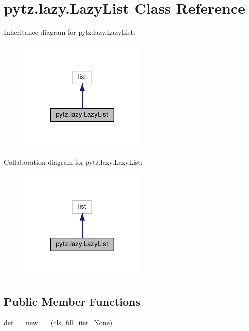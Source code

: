 \hypertarget{classpytz_1_1lazy_1_1LazyList}{}\section{pytz.\+lazy.\+Lazy\+List Class Reference}
\label{classpytz_1_1lazy_1_1LazyList}


Inheritance diagram for pytz.\+lazy.\+Lazy\+List\+:
\nopagebreak
\begin{figure}[H]
\begin{center}
\leavevmode
\includegraphics[width=176pt]{classpytz_1_1lazy_1_1LazyList__inherit__graph}
\end{center}
\end{figure}


Collaboration diagram for pytz.\+lazy.\+Lazy\+List\+:
\nopagebreak
\begin{figure}[H]
\begin{center}
\leavevmode
\includegraphics[width=176pt]{classpytz_1_1lazy_1_1LazyList__coll__graph}
\end{center}
\end{figure}
\subsection*{Public Member Functions}
\begin{DoxyCompactItemize}
\item 
def \hyperlink{classpytz_1_1lazy_1_1LazyList_ac09f0492047f1aff6916555931eaa2d6}{\+\_\+\+\_\+new\+\_\+\+\_\+} (cls, fill\+\_\+iter=None)
\end{DoxyCompactItemize}



